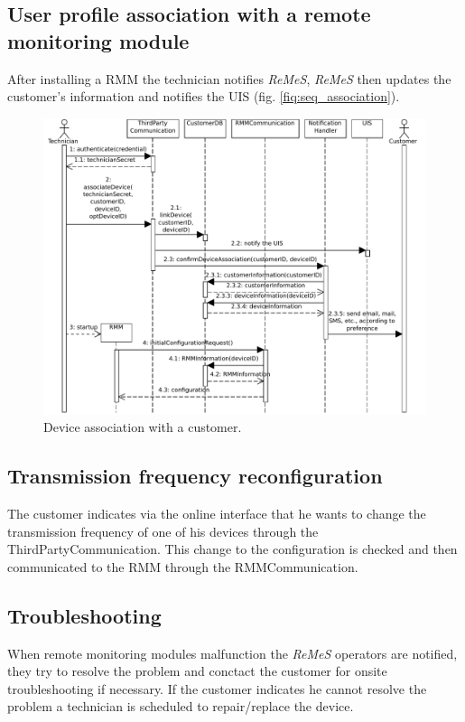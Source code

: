 \documentclass[a4paper,10pt]{article}
\newcommand{\rem}{\emph{ReMeS}\xspace}
\begin{document}
\subsection{User profile association with a remote monitoring module}
After installing a RMM the technician notifies \rem, \rem then updates the customer's information and notifies the UIS (fig. \ref{fiq:seq_association}).

\begin{figure}[!htp]
    \centering
    \includegraphics[width=\textwidth]{User profile association with a remote monitoring module}
    \caption{Device association with a customer.
        }\label{fig:seq_association}
\end{figure}

\subsection{Transmission frequency reconfiguration}
The customer indicates via the online interface that he wants to change the transmission frequency of one of his devices through the ThirdPartyCommunication. This change to the configuration is checked and then communicated to the RMM through the RMMCommunication.

\subsection{Troubleshooting}
When remote monitoring modules malfunction the \rem operators are notified, they try to resolve the problem and conctact the customer for onsite troubleshooting if necessary. If the customer indicates he cannot resolve the problem a technician is scheduled to repair/replace the device.
\end{document}
